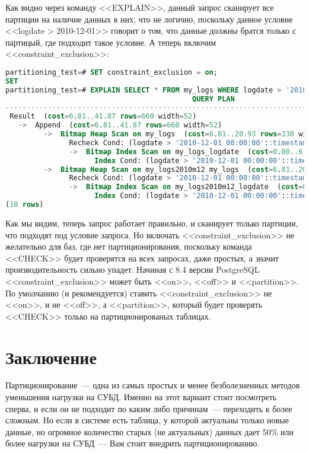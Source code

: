 Как видно через команду <<EXPLAIN>>, данный запрос сканирует все партиции на наличие данных в них, что не логично, 
поскольку данное условие <<logdate > 2010-12-01>> говорит о том, что данные должны братся только с партицый, 
где подходит такое условие. А теперь включим <<constraint\_exclusion>>:
\begin{lstlisting}[language=SQL,label=lst:partitioning15,caption=<<constraint\_exclusion>> ON]
partitioning_test=# SET constraint_exclusion = on;
SET
partitioning_test=# EXPLAIN SELECT * FROM my_logs WHERE logdate > '2010-12-01';
                                            QUERY PLAN                                             
---------------------------------------------------------------------------------------------------
 Result  (cost=6.81..41.87 rows=660 width=52)
   ->  Append  (cost=6.81..41.87 rows=660 width=52)
         ->  Bitmap Heap Scan on my_logs  (cost=6.81..20.93 rows=330 width=52)
               Recheck Cond: (logdate > '2010-12-01 00:00:00'::timestamp without time zone)
               ->  Bitmap Index Scan on my_logs_logdate  (cost=0.00..6.73 rows=330 width=0)
                     Index Cond: (logdate > '2010-12-01 00:00:00'::timestamp without time zone)
         ->  Bitmap Heap Scan on my_logs2010m12 my_logs  (cost=6.81..20.93 rows=330 width=52)
               Recheck Cond: (logdate > '2010-12-01 00:00:00'::timestamp without time zone)
               ->  Bitmap Index Scan on my_logs2010m12_logdate  (cost=0.00..6.73 rows=330 width=0)
                     Index Cond: (logdate > '2010-12-01 00:00:00'::timestamp without time zone)
(10 rows)
\end{lstlisting}

Как мы видим, теперь запрос работает правильно, и сканирует только партиции, что подходят под условие запроса.
Но включать <<constraint\_exclusion>> не желательно для баз, где нет партиционирования, 
поскольку команда <<CHECK>> будет проверятся на всех запросах, даже простых, а значит производительность сильно упадет.
Начиная с 8.4 версии PostgreSQL <<constraint\_exclusion>> может быть <<on>>, <<off>> и <<partition>>. По умолчанию 
(и рекомендуется) ставить 
<<constraint\_exclusion>> не <<on>>, и не <<off>>, а <<partition>>, который будет проверять <<CHECK>> только на 
партиционированых таблицах. 

\section{Заключение}
Партиционирование~--- одна из самых простых и менее безболезненных методов уменьшения нагрузки на СУБД. 
Именно на этот вариант стоит посмотреть сперва, и если он не подходит по каким либо причинам~--- переходить к более сложным.
Но если в системе есть таблица, у которой актуальны только новые данные, но огромное количество старых (не актуальных)
данных дает 50\% или более нагрузки на СУБД~--- Вам стоит внедрить партиционированию.